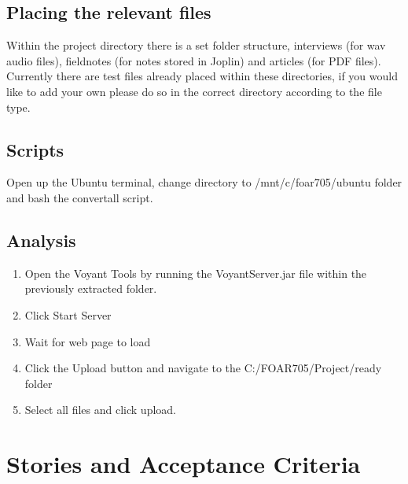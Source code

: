 \documentclass{article}
\begin{document}
\subsection{Placing the relevant files}
Within the project directory there is a set folder structure, interviews (for wav audio files), fieldnotes (for notes stored in Joplin) and articles (for PDF files). Currently there are test files already placed within these directories, if you would like to add your own please do so in the correct directory according to the file type.

\subsection{Scripts}
Open up the Ubuntu terminal, change directory to /mnt/c/foar705/ubuntu folder and bash the convertall script.

\subsection{Analysis}
\begin{enumerate}
    \item Open the Voyant Tools by running the VoyantServer.jar file within the previously extracted folder.
    \item Click Start Server
    \item Wait for web page to load
    \item Click the Upload button and navigate to the C:/FOAR705/Project/ready folder
    \item Select all files and click upload.
\end{enumerate}

\section{Stories and Acceptance Criteria}
\end{document}
